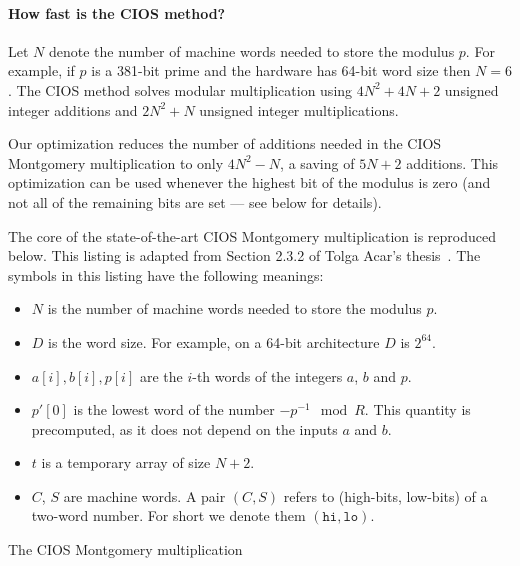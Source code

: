 \documentclass[journal=tches,spthm]{iacrtrans}
\begin{document}
\paragraph{How fast is the CIOS method?}
Let $N$ denote the number of machine words needed to store the modulus $p$.
For example, if $p$ is a 381-bit prime and the hardware has 64-bit word size
then $N=6$.  The CIOS method solves modular multiplication using $4N^2+4N+2$
unsigned integer additions and $2N^2+N$ unsigned integer multiplications.

Our optimization reduces the number of additions needed in the CIOS Montgomery
multiplication to only $4N^2-N$, a saving of $5N+2$ additions.  This
optimization can be used whenever the highest bit of the modulus is zero (and
not all of the remaining bits are set — see below for details).

The core of the state-of-the-art CIOS Montgomery multiplication is reproduced
below. This listing is adapted from Section 2.3.2 of Tolga Acar’s
thesis~\cite{acar1998high-speed}. The symbols in this listing have the
following meanings:

\begin{itemize}
    \item $N$ is the number of machine words needed to store the modulus $p$.
    \item $D$ is the word size. For example, on a 64-bit architecture $D$ is $2^{64}$.
    \item $a[i], b[i], p[i]$ are the $i$-th words of the integers $a$, $b$ and $p$.
    \item $p'[0]$ is the lowest word of the number $-p^{-1} \mod R$. This quantity is precomputed, as it does not depend on the inputs  $a$ and $b$.
    \item $t$ is a temporary array of size $N+2$.
    \item $C$, $S$ are machine words. A pair $(C,S)$ refers to (high-bits, low-bits) of a two-word number. For short we denote them $(\texttt{hi}, \texttt{lo})$.
\end{itemize}
%
\begin{algorithm}[hbt]
    \SetAlgoLined
  \caption{The CIOS Montgomery multiplication}
  \label{alg:cios-mont-mul}
\end{algorithm}
\end{document}
